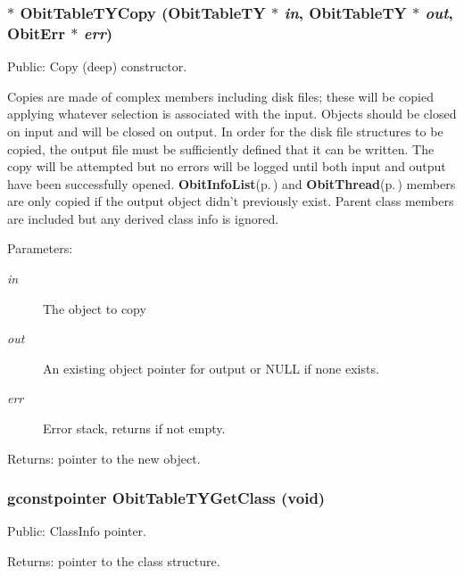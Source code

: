 \subsubsection{$\ast$ Obit\-Table\-TYCopy ({\bf Obit\-Table\-TY} $\ast$ {\em in}, {\bf Obit\-Table\-TY} $\ast$ {\em out}, {\bf Obit\-Err} $\ast$ {\em err})}\label{ObitTableTY_8c_a20}


Public: Copy (deep) constructor. 

Copies are made of complex members including disk files; these will be copied applying whatever selection is associated with the input. Objects should be closed on input and will be closed on output. In order for the disk file structures to be copied, the output file must be sufficiently defined that it can be written. The copy will be attempted but no errors will be logged until both input and output have been successfully opened. {\bf Obit\-Info\-List}{\rm (p.\,\pageref{structObitInfoList})} and {\bf Obit\-Thread}{\rm (p.\,\pageref{structObitThread})} members are only copied if the output object didn't previously exist. Parent class members are included but any derived class info is ignored. \begin{Desc}
\item[Parameters:]
\begin{description}
\item[{\em in}]The object to copy \item[{\em out}]An existing object pointer for output or NULL if none exists. \item[{\em err}]Error stack, returns if not empty. \end{description}
\end{Desc}
\begin{Desc}
\item[Returns:]pointer to the new object. \end{Desc}
\subsubsection{\setlength{\rightskip}{0pt plus 5cm}gconstpointer Obit\-Table\-TYGet\-Class (void)}\label{ObitTableTY_8c_a17}


Public: Class\-Info pointer. 

\begin{Desc}
\item[Returns:]pointer to the class structure. \end{Desc}
